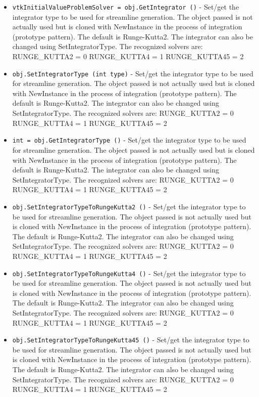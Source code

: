 \begin{itemize}
\item  \verb|vtkInitialValueProblemSolver = obj.GetIntegrator ()| -  Set/get the integrator type to be used for streamline generation. 
 The object passed is not actually used but is cloned with 
 NewInstance in the process of integration  (prototype pattern). 
 The default is Runge-Kutta2. The integrator can also be changed
 using SetIntegratorType. The recognized solvers are:
 RUNGE\_KUTTA2  = 0
 RUNGE\_KUTTA4  = 1
 RUNGE\_KUTTA45 = 2

\item  \verb|obj.SetIntegratorType (int type)| -  Set/get the integrator type to be used for streamline generation. 
 The object passed is not actually used but is cloned with 
 NewInstance in the process of integration  (prototype pattern). 
 The default is Runge-Kutta2. The integrator can also be changed
 using SetIntegratorType. The recognized solvers are:
 RUNGE\_KUTTA2  = 0
 RUNGE\_KUTTA4  = 1
 RUNGE\_KUTTA45 = 2

\item  \verb|int = obj.GetIntegratorType ()| -  Set/get the integrator type to be used for streamline generation. 
 The object passed is not actually used but is cloned with 
 NewInstance in the process of integration  (prototype pattern). 
 The default is Runge-Kutta2. The integrator can also be changed
 using SetIntegratorType. The recognized solvers are:
 RUNGE\_KUTTA2  = 0
 RUNGE\_KUTTA4  = 1
 RUNGE\_KUTTA45 = 2

\item  \verb|obj.SetIntegratorTypeToRungeKutta2 ()| -  Set/get the integrator type to be used for streamline generation. 
 The object passed is not actually used but is cloned with 
 NewInstance in the process of integration  (prototype pattern). 
 The default is Runge-Kutta2. The integrator can also be changed
 using SetIntegratorType. The recognized solvers are:
 RUNGE\_KUTTA2  = 0
 RUNGE\_KUTTA4  = 1
 RUNGE\_KUTTA45 = 2

\item  \verb|obj.SetIntegratorTypeToRungeKutta4 ()| -  Set/get the integrator type to be used for streamline generation. 
 The object passed is not actually used but is cloned with 
 NewInstance in the process of integration  (prototype pattern). 
 The default is Runge-Kutta2. The integrator can also be changed
 using SetIntegratorType. The recognized solvers are:
 RUNGE\_KUTTA2  = 0
 RUNGE\_KUTTA4  = 1
 RUNGE\_KUTTA45 = 2

\item  \verb|obj.SetIntegratorTypeToRungeKutta45 ()| -  Set/get the integrator type to be used for streamline generation. 
 The object passed is not actually used but is cloned with 
 NewInstance in the process of integration  (prototype pattern). 
 The default is Runge-Kutta2. The integrator can also be changed
 using SetIntegratorType. The recognized solvers are:
 RUNGE\_KUTTA2  = 0
 RUNGE\_KUTTA4  = 1
 RUNGE\_KUTTA45 = 2


\end{itemize}
